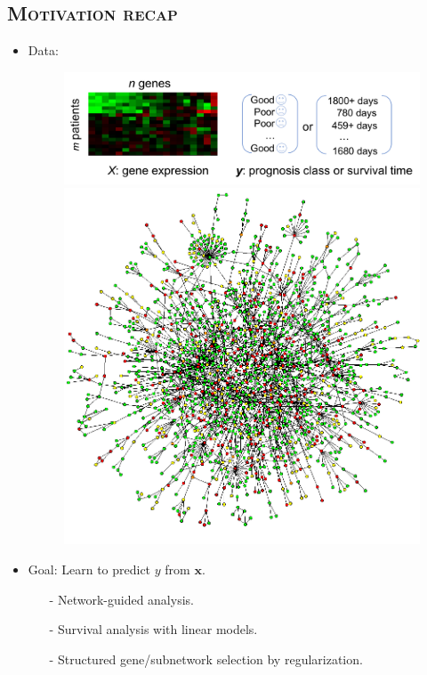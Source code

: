 \documentclass[xcolor=x11names,compress]{beamer}
\theoremstyle{plain}
\renewcommand{\(}{\begin{columns}}
\renewcommand{\)}{\end{columns}}
\newcommand{\<}[1]{\begin{column}{#1}}
\renewcommand{\>}{\end{column}}
\begin{document}
\subsection{\scshape Motivation recap}
\begin{frame}{\insertsubsection}
	
	\begin{itemize}
		\item Data: 
		\begin{figure}
			\centering
			\includegraphics[width=0.7\linewidth]{slides/prognosis}%
			\hskip 0.1cm%
			\includegraphics[width=0.25\linewidth]{slides/ppi}
		\end{figure}
		
		\item Goal: Learn to predict $y$ from $\mathbf{x}$.
		\begin{itemize}
			\item[-] Network-guided analysis.
			\item[-] Survival analysis with linear models.
			\item[-] Structured gene/subnetwork selection by regularization.
		\end{itemize}
	\end{itemize}
	
\end{frame}
\end{document}
